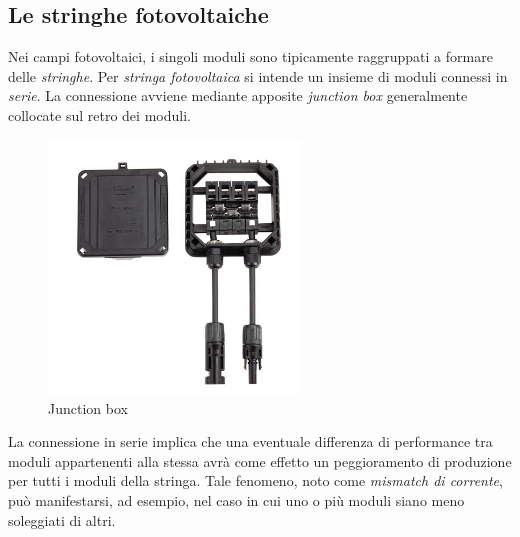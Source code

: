 %
\subsection{Le stringhe fotovoltaiche}
Nei campi fotovoltaici, i singoli moduli sono tipicamente
raggruppati a formare delle \emph{stringhe}.
%
Per \emph{stringa fotovoltaica} si intende un insieme di moduli 
connessi in \emph{serie}. La connessione avviene mediante apposite 
\emph{junction box} generalmente collocate sul retro dei moduli.
%
\begin{figure}[!h]
\centering
\includegraphics[width=190pt]{img/pv-junction-box.jpg}
\caption{Junction box}
\end{figure}
%
La connessione in serie implica che una eventuale differenza di 
performance tra moduli appartenenti alla stessa avr\`a come effetto 
un peggioramento di produzione per tutti i moduli della stringa.
%
Tale fenomeno, noto come \emph{mismatch di corrente}, pu\`o manifestarsi,
ad esempio, nel caso in cui uno o pi\`u moduli siano meno soleggiati 
di altri.






















